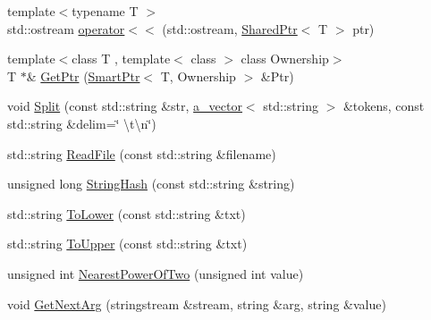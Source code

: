 \begin{DoxyCompactItemize}
\item 
{\footnotesize template$<$typename T $>$ }\\std\+::ostream \hyperlink{namespace_agmd_utilities_af8e708c4fba70b361704afa1e71ae24d}{operator$<$$<$} (std\+::ostream, \hyperlink{class_agmd_utilities_1_1_shared_ptr}{Shared\+Ptr}$<$ T $>$ ptr)
\item 
{\footnotesize template$<$class T , template$<$ class $>$ class Ownership$>$ }\\T $\ast$\& \hyperlink{namespace_agmd_utilities_a16745e032142366c70e043edd676b63d}{Get\+Ptr} (\hyperlink{class_agmd_utilities_1_1_smart_ptr}{Smart\+Ptr}$<$ T, Ownership $>$ \&Ptr)
\item 
void \hyperlink{namespace_agmd_utilities_af87c486cd5cd1a95e8fcd297d6cec42c}{Split} (const std\+::string \&str, \hyperlink{_vector_8h_a3df82cea60ff4ad0acb44e58454406a5}{a\+\_\+vector}$<$ std\+::string $>$ \&tokens, const std\+::string \&delim=\char`\"{} \textbackslash{}t\textbackslash{}n\char`\"{})
\item 
std\+::string \hyperlink{namespace_agmd_utilities_aaf4233254edeefb278f06c427e27457a}{Read\+File} (const std\+::string \&filename)
\item 
unsigned long \hyperlink{namespace_agmd_utilities_a76f673217cb0529bee1a3881eb867728}{String\+Hash} (const std\+::string \&string)
\item 
std\+::string \hyperlink{namespace_agmd_utilities_a5d5e26cbf9ab10118cc03e8e5e74705e}{To\+Lower} (const std\+::string \&txt)
\item 
std\+::string \hyperlink{namespace_agmd_utilities_adfb1d2e637833ad572d631b677f616d4}{To\+Upper} (const std\+::string \&txt)
\item 
unsigned int \hyperlink{namespace_agmd_utilities_aef7478369eff0da951bec8706f554d9b}{Nearest\+Power\+Of\+Two} (unsigned int value)
\item 
void \hyperlink{namespace_agmd_utilities_a93fcd224f4430677094349eef3062377}{Get\+Next\+Arg} (stringstream \&stream, string \&arg, string \&value)
\end{DoxyCompactItemize}


